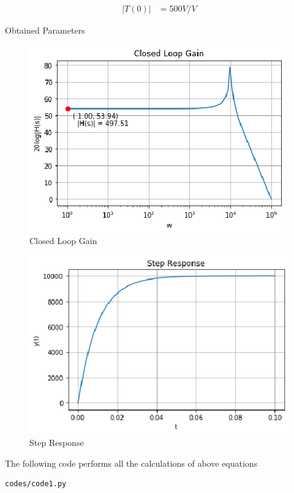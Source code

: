 \begin{enumerate}[label=\thesection.\arabic*.,ref=\thesection.\theenumi]
\begin{align}
|T(0)| &= 500 V/V
\end{align}

\begin{table}[!ht]
\centering

\caption{Obtained Parameters}
\label{table:Calculated_params}
\end{table}


\begin{figure}[!ht]
\centering
    \includegraphics[width=\columnwidth]{./figs/Figure_2.eps}
  \caption{Closed Loop Gain}
  \label{fig:ClosedLoopGain}
\end{figure}

\begin{figure}[!ht]
\centering
    \includegraphics[width=\columnwidth]{./figs/Figure_3.eps}
  \caption{Step Response}
  \label{fig:stepResponse}
\end{figure}
The following code performs all the calculations of above equations
\begin{lstlisting}
codes/code1.py
\end{lstlisting}


\end{enumerate}
